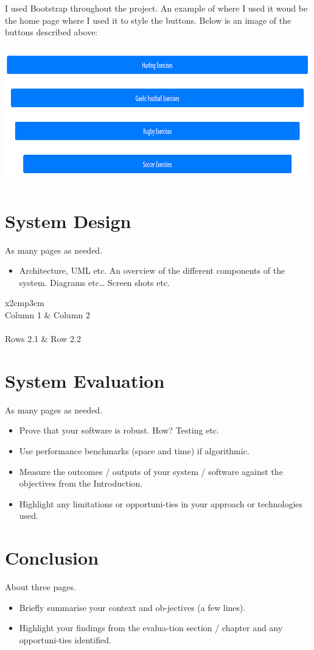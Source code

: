 I used Bootstrap throughout the project. An example of where I used it woud be the home page where I used it to style the buttons. Below is an image of the buttons described above:

\begin{center}    
\includegraphics{img/button.png}
\end{center}

\chapter{System Design}
As many pages as needed.
\begin{itemize}
\item Architecture, UML etc. An overview of the different components of the system. Diagrams etc… Screen shots etc.
\end{itemize}

\begin{table}[h]
  \centering
  \begin{tabular}{x{2cm}p{3cm}}
    \toprule \\
    Column 1 & Column 2 \\
    \midrule \\
    Rows 2.1 & Row 2.2 \\
    \bottomrule
  \end{tabular}
  \caption{A table.}
  \label{table:mytable}
\end{table}

\chapter{System Evaluation}
As many pages as needed.
\begin{itemize}
\item Prove that your software is robust. How? Testing etc. 
\item Use performance benchmarks (space and time) if algorithmic.
\item Measure the outcomes / outputs of your system / software against the objectives from the Introduction.
\item Highlight any limitations or opportuni-ties in your approach or technologies used.
\end{itemize}

\chapter{Conclusion}
About three pages.

\begin{itemize}
\item Briefly summarise your context and ob-jectives (a few lines).
\item Highlight your findings from the evalua-tion section / chapter and any opportuni-ties identified.
\end{itemize}

